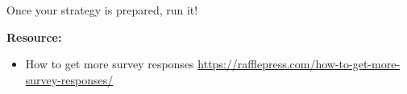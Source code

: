 Once your strategy is prepared, run it!

\textbf{Resource:}

\begin{itemize}
\item How to get more survey responses \url{https://rafflepress.com/how-to-get-more-survey-responses/}
\end{itemize}

